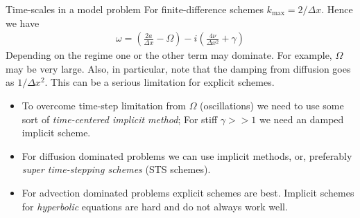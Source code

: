 \documentclass[aspectratio=169]{beamer}
\newcommand{\mypause}{}
\begin{document}
\begin{frame}{Time-scales in a model problem}
  For finite-difference schemes $k_{\textrm{max}} = 2/\Delta x$. Hence
  we have
  \begin{align*}
    \omega = \left(\frac{2a}{\Delta x}  - \Omega\right) -
    i \left(\frac{4\nu}{\Delta x^2} + \gamma \right)
  \end{align*}
  Depending on the regime one or the other term may dominate. For
  example, $\Omega$ may be very large.  Also, in particular, note that
  the damping from diffusion goes as $1/\Delta x^2$. This can be a
  serious limitation for explicit schemes.
  \begin{itemize}
  \item To overcome time-step limitation from $\Omega$ (oscillations)
    we need to use some sort of \emph{time-centered implicit method};
    For stiff $\gamma >> 1$ we need an damped implicit scheme.%
    \mypause%
  \item For diffusion dominated problems we can use implicit methods,
    or, preferably \emph{super time-stepping schemes} (STS schemes).%
    \mypause%
  \item For advection dominated problems explicit schemes are
    best. Implicit schemes for \emph{hyperbolic} equations are hard
    and do not always work well.
  \end{itemize}
\end{frame}
\end{document}
